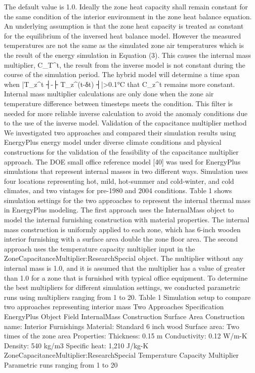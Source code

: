 The default value is 1.0. Ideally the zone heat capacity shall remain constant for the same condition of the interior environment in the zone heat balance equation. An underlying assumption is that the zone heat capacity is treated as constant for the equilibrium of the inversed heat balance model. However the measured temperatures are not the same as the simulated zone air temperatures which is the result of the energy simulation in Equation (3). This causes the internal mass multiplier, C_T^t, the result from the inverse model is not constant during the course of the simulation period. The hybrid model will determine a time span when |T_z^t ┤-├ T_z^(t-δt) ┤|>0.1°C that C_z^t remains more constant. Internal mass multiplier calculations are only done when the zone air temperature difference between timesteps meets the condition. This filter is needed for more reliable inverse calculation to avoid the anomaly conditions due to the use of the inverse model.  
Validation of the capacitance multiplier method
We investigated two approaches and compared their simulation results using EnergyPlus energy model under diverse climate conditions and physical constructions for the validation of the feasibility of the capacitance multiplier approach. The DOE small office reference model [40] was used for EnergyPlus simulations that represent internal masses in two different ways. Simulation uses four locations representing hot, mild, hot-summer and cold-winter, and cold climates, and two vintages for pre-1980 and 2004 conditions. Table 1 shows simulation settings for the two approaches to represent the internal thermal mass in EnergyPlus modeling. The first approach uses the InternalMass object to model the internal furnishing construction with material properties. The internal mass construction is uniformly applied to each zone, which has 6-inch wooden interior furnishing with a surface area double the zone floor area. The second approach uses the temperature capacity multiplier input in the ZoneCapacitanceMultiplier:ResearchSpecial object. The multiplier without any internal mass is 1.0, and it is assumed that the multiplier has a value of greater than 1.0 for a zone that is furnished with typical office equipment. To determine the best multipliers for different simulation settings, we conducted parametric runs using multipliers ranging from 1 to 20. 
Table 1 Simulation setup to compare two approaches representing interior mass
Two Approaches	Specification
EnergyPlus Object	Field	
InternalMass		Construction
	Surface Area		Construction name: Interior Furnishings
	Material: Standard 6 inch wood
	Surface area: Two times of the zone area
	Properties:
	Thickness: 0.15 m
	Conductivity: 0.12 W/m-K
	Density: 540 kg/m3
	Specific heat: 1,210 J/kg-K
ZoneCapacitanceMultiplier:ResearchSpecial	Temperature Capacity Multiplier	Parametric runs ranging from 1 to 20


